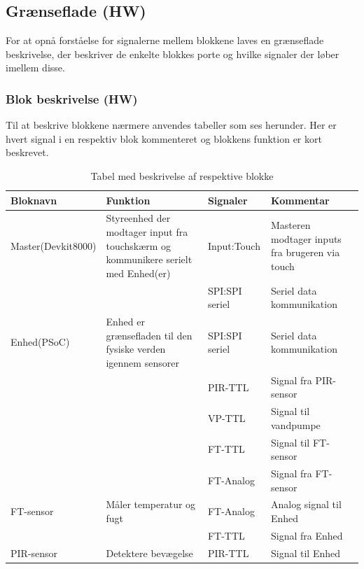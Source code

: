 \begin{table}[H] %
\subsection{Grænseflade (HW)}
For at opnå forståelse for signalerne mellem blokkene laves en grænseflade beskrivelse, der beskriver de enkelte blokkes porte og hvilke signaler der løber imellem disse.

\subsubsection{Blok beskrivelse (HW)}
Til at beskrive blokkene nærmere anvendes tabeller som ses herunder. Her er hvert signal i en respektiv blok kommenteret og blokkens funktion er kort beskrevet. 

\caption{Tabel med beskrivelse af respektive blokke}
\begin{small}
\begin{tabular}{|p{}|p{}|p{}|p{}|}
\hline
\textbf{Bloknavn} & \textbf{Funktion} & \textbf{Signaler} & \textbf{Kommentar} \\ \hline

Master(Devkit8000) & Styreenhed der modtager input fra touchskærm og kommunikere serielt med Enhed(er) & Input:Touch & Masteren modtager inputs fra brugeren via touch \\ \cline{3-4}	
& 				   & SPI:SPI seriel & Seriel data kommunikation \\ \hline

Enhed(PSoC) & Enhed er grænsefladen til den fysiske verden igennem sensorer & SPI:SPI seriel & Seriel data kommunikation \\ \cline{3-4}
& & PIR-TTL 		& Signal fra PIR-sensor	\\ \cline{3-4}
& & VP-TTL 		& Signal til vandpumpe 	\\ \cline{3-4}
& & FT-TTL 		& Signal til FT-sensor 	\\ \cline{3-4}
& & FT-Analog 	& Signal fra FT-sensor 	\\ \hline

FT-sensor & Måler temperatur og fugt & FT-Analog & Analog signal til Enhed \\ \cline{3-4}
& & FT-TTL 	& Signal fra Enhed 	\\ \hline

PIR-sensor & Detektere bevægelse & PIR-TTL & Signal til Enhed \\ \hline


\end{tabular}
\end{small}
\end{table}
